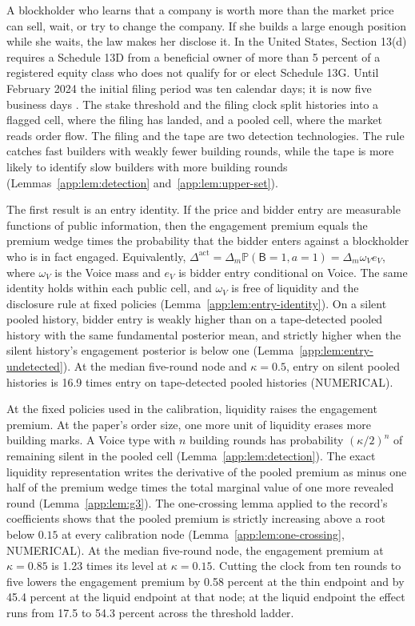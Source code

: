 \documentclass[11pt]{article}
\newcommand{\Prb}{\mathbb{P}}
\newcommand{\Dact}{\Delta^{\mathrm{act}}}
\begin{document}
A blockholder who learns that a company is worth more than the market price can sell, wait, or try
to change the company. If she builds a large enough position while she waits, the law makes her
disclose it. In the United States, Section 13(d) requires a Schedule 13D from a beneficial owner of
more than 5 percent of a registered equity class who does not qualify for or elect Schedule 13G.
Until February 2024 the initial filing period was ten calendar days; it is now five business days
\citep{SEC2023}. The stake threshold and the filing clock split histories into a flagged cell, where
the filing has landed, and a pooled cell, where the market reads order flow. The filing and the tape
are two detection technologies. The rule catches fast builders with weakly fewer building rounds,
while the tape is more likely to identify slow builders with more building rounds
(Lemmas~\ref{app:lem:detection} and~\ref{app:lem:upper-set}).

The first result is an entry identity. If the price and bidder entry are measurable functions of
public information, then the engagement premium equals the premium wedge times the probability that
the bidder enters against a blockholder who is in fact engaged. Equivalently,
$\Dact=\Delta_m\Prb(\mathsf B=1,a=1)=\Delta_m\omega_V e_V$, where $\omega_V$ is the Voice mass and
$e_V$ is bidder entry conditional on Voice. The same identity holds within each public cell, and
$\omega_V$ is free of liquidity and the disclosure rule at fixed policies
(Lemma~\ref{app:lem:entry-identity}). On a silent pooled history, bidder entry is weakly higher than
on a tape-detected pooled history with the same fundamental posterior mean, and strictly higher when
the silent history's engagement posterior is below one (Lemma~\ref{app:lem:entry-undetected}). At the
median five-round node and $\kappa=0.5$, entry on silent pooled histories is 16.9 times entry on
tape-detected pooled histories (NUMERICAL).

At the fixed policies used in the calibration, liquidity raises the engagement premium. At the
paper's order size, one more unit of liquidity erases more building marks. A Voice type with $n$
building rounds has probability
$(\kappa/2)^n$ of remaining silent in the pooled cell (Lemma~\ref{app:lem:detection}). The exact
liquidity representation writes the derivative of the pooled premium as minus one half of the
premium wedge times the total marginal value of one more revealed round
(Lemma~\ref{app:lem:g3}). The one-crossing lemma applied to the record's coefficients shows that the
pooled premium is strictly increasing above a root below $0.15$ at every calibration node
(Lemma~\ref{app:lem:one-crossing}, NUMERICAL). At the median five-round node, the engagement premium
at $\kappa=0.85$ is 1.23 times its level at $\kappa=0.15$. Cutting the clock from ten rounds to five
lowers the engagement premium by 0.58 percent at the thin endpoint and by 45.4 percent at the liquid
endpoint at that node; at the liquid endpoint the effect runs from 17.5 to 54.3 percent across the
threshold ladder.
\end{document}
